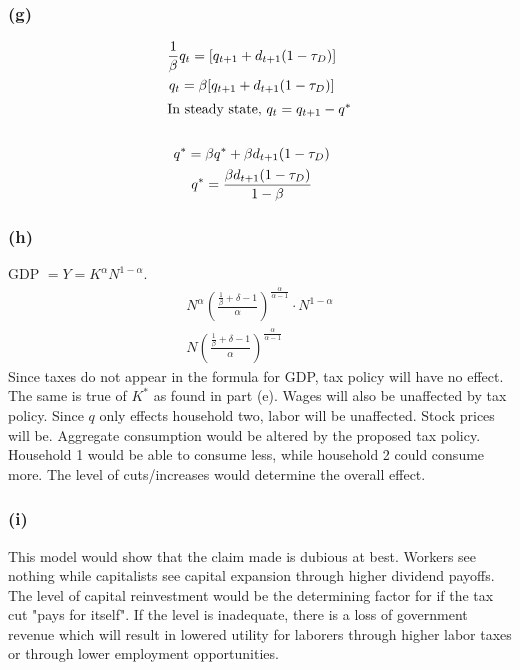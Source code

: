 \documentclass[10pt, a4paper]{article}
\begin{document}
    \subsubsection*{(g)}
      \begin{gather*}
        \frac{1}{\beta}q_t = [q_{t+1}+d_{t+1}(1-\tau_D)] \\
        q_t = \beta [q_{t+1}+d_{t+1}(1-\tau_D)] \\
        \shortintertext{In steady state, $q_t=q_{t+1}-q^*$} \\
        q^* = \beta q^*+\beta d_{t+1}(1-\tau_D) \\
        q^* = \frac{\beta d_{t+1}(1-\tau_D)}{1-\beta} \\
      \end{gather*}
    \subsubsection*{(h)}
      GDP $ = Y = K^{\alpha}N^{1-\alpha}$.
      \begin{gather*}
        N^{\alpha}(\frac{\frac{1}{\beta}+\delta-1}{\alpha})^{\frac{\alpha}{\alpha-1}}\cdot N^{1-\alpha} \\
        N(\frac{\frac{1}{\beta}+\delta-1}{\alpha})^{\frac{\alpha}{\alpha-1}}
      \end{gather*}
      Since taxes do not appear in the formula for GDP, tax policy will have no effect. The same is true of $K^*$ as found in part (e). Wages will also be unaffected by tax policy. Since $q$ only effects household two, labor will be unaffected. Stock prices will be. Aggregate consumption would be altered by the proposed tax policy. Household 1 would be able to consume less, while household 2 could consume more. The level of cuts/increases would determine the overall effect.
    \subsubsection{(i)}
      This model would show that the claim made is dubious at best. Workers see nothing while capitalists see capital expansion through higher dividend payoffs. The level of capital reinvestment would be the determining factor for if the tax cut "pays for itself". If the level is inadequate, there is a loss of government revenue which will result in lowered utility for laborers through higher labor taxes or through lower employment opportunities.
\end{document}
